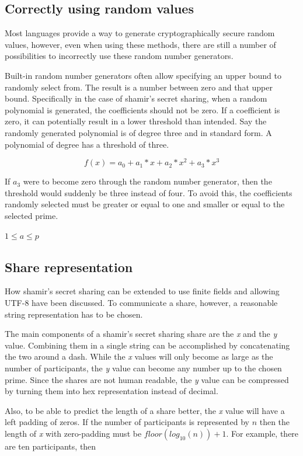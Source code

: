 \subsection{Correctly using random values}

Most languages provide a way to generate cryptographically secure random
values, however, even when using these methods, there are still a number of
possibilities to incorrectly use these random number generators.

Built-in random number generators often allow specifying an upper bound to
randomly select from. The result is a number between zero and that upper bound.
Specifically in the case of shamir's secret sharing, when a random polynomial
is generated, the coefficients should not be zero. If a coefficient is zero, it
can potentially result in a lower threshold than intended. Say the randomly
generated polynomial is of degree three and in standard form. A polynomial of
degree has a threshold of three.

$$f(x) = a_0 + a_1 * x + a_2 * x^2 + a_3 * x^3$$

If $a_3$ were to become zero through the random number generator, then the
threshold would suddenly be three instead of four. To avoid this, the
coefficients randomly selected must be greater or equal to one and smaller or
equal to the selected prime.

$1 \leq a \leq p$

\subsection{Share representation}

How shamir's secret sharing can be extended to use finite fields and allowing
UTF-8 have been discussed. To communicate a share, however, a reasonable string
representation has to be chosen.

The main components of a shamir's secret sharing share are the \textit{x} and
the \textit{y} value. Combining them in a single string can be accomplished by
concatenating the two around a dash. While the \textit{x} values will only
become as large as the number of participants, the \textit{y} value can become
any number up to the chosen prime. Since the shares are not human readable,
the \textit{y} value can be compressed by turning them into hex representation
instead of decimal.

Also, to be able to predict the length of a share better, the \textit{x} value
will have a left padding of zeros. If the number of participants is represented
by $n$ then the length of \textit{x} with zero-padding must be
$floor(log_{10}(n))+1$. For example, there are ten participants, then

